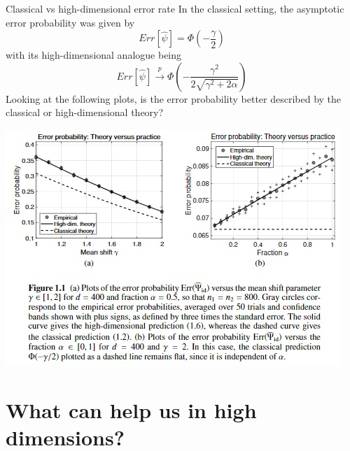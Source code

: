 \documentclass[10pt,handout,english]{beamer}
\newcommand{\1}{\mathbbm{1}}
\begin{document}
\begin{frame}{Classical vs high-dimensional error rate}
In the classical setting, the asymptotic error probability was given by\justifying 
\[
Err[\hat{\psi}]=\Phi\left(-\frac{\gamma}{2}\right)
\]
with its high-dimensional analogue being
\[
Err[\hat{\psi}]\overset{p}{\to}\Phi\left(-\frac{\gamma^2}{2\sqrt{\gamma^2+2\alpha}}\right)
\]
Looking at the following plots, is the error probability better described by the classical or high-dimensional theory?
\end{frame}
\begin{frame}
\includegraphics{ErrPerf}
\end{frame}
\section{What can help us in high dimensions?}
\frame{\tableofcontents[currentsection]}
\begin{frame}
\end{frame}
\end{document}
